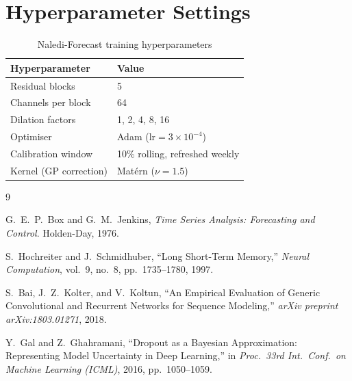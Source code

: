\chapter{Hyperparameter Settings}
\begin{table}[htbp]
\centering
\caption{Naledi-Forecast training hyperparameters}
\label{tab:hyperparams}
\begin{tabularx}{\linewidth}{@{}lX@{}}
\toprule
\textbf{Hyperparameter} & \textbf{Value} \\
\midrule
Residual blocks & 5 \\
Channels per block & 64 \\
Dilation factors & 1, 2, 4, 8, 16 \\
Optimiser & Adam ($\text{lr}=3\times10^{-4}$) \\
Calibration window & 10\% rolling, refreshed weekly \\
Kernel (GP correction) & Matérn ($\nu = 1.5$) \\
\bottomrule
\end{tabularx}
\end{table}

\begin{thebibliography}{9}

G.\ E.\ P.\ Box and G.\ M.\ Jenkins,
\textit{Time Series Analysis: Forecasting and Control}.
Holden-Day, 1976.

S.\ Hochreiter and J.\ Schmidhuber,
``Long Short-Term Memory,''
\textit{Neural Computation}, vol.\ 9, no.\ 8, pp.\ 1735--1780, 1997.

S.\ Bai, J.\ Z.\ Kolter, and V.\ Koltun,
``An Empirical Evaluation of Generic Convolutional and Recurrent Networks for Sequence
Modeling,''
\textit{arXiv preprint arXiv:1803.01271}, 2018.

Y.\ Gal and Z.\ Ghahramani,
``Dropout as a Bayesian Approximation: Representing Model Uncertainty in Deep Learning,''
in \textit{Proc.\ 33rd Int.\ Conf.\ on Machine Learning (ICML)}, 2016, pp.\ 1050--1059.

\end{thebibliography}

